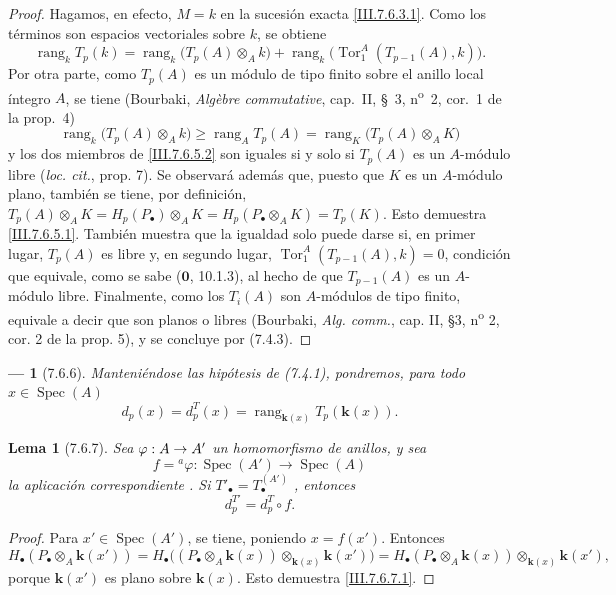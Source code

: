 \documentclass[10pt,oneside,openany]{book}
\theoremstyle{egaenv}\newtheorem*{env}{---}
\theoremstyle{egastatement}
\newtheorem*{lemma}{Lema}
\theoremstyle{egadescription}
\newcommand{\oldpage}[2][]{\marginnote{\normalfont\scriptsize\textbf{#1}\,|\,#2}\ignorespaces}
\renewcommand{\geq}{\geqslant}
\renewcommand{\to}{\mathchoice{\longrightarrow}{\rightarrow}{\rightarrow}{\rightarrow}}
\begin{document}
\begin{proof}
Hagamos, en efecto, $M=k$ en la sucesión exacta \eqref{III.7.6.3.1}. Como los
términos son espacios vectoriales sobre $k$, se obtiene
\[
  \operatorname{rang}_k T_p(k)
  =
  \operatorname{rang}_k\bigl(T_p(A)\otimes_A k\bigr)
  +
  \operatorname{rang}_k\bigl(\operatorname{Tor}_1^A(T_{p-1}(A),k)\bigr).
\]
Por otra parte, como $T_p(A)$ es un módulo de tipo finito sobre el
anillo local íntegro $A$, se tiene (Bourbaki,
\emph{Alg\`ebre commutative}, cap.~II, \S~3,
n\textsuperscript{o}~2, cor.~1 de la prop.~4)
\[
  \operatorname{rang}_k\bigl(T_p(A)\otimes_A k\bigr)
  \geq
  \operatorname{rang}_A T_p(A)
  =
  \operatorname{rang}_K\bigl(T_p(A)\otimes_A K\bigr)
  \tag{7.6.5.2}\label{III.7.6.5.2.fr}
\]
y los dos miembros de \eqref{III.7.6.5.2} son iguales si y solo si
$T_p(A)$ es un $A$-módulo libre (\emph{loc. cit.}, prop. 7). Se observará además que, puesto que $K$ es un $A$-módulo plano, también se tiene, por definición,
$T_p(A)\otimes_A K=H_p(P_\bullet)\otimes_A K=H_p(P_\bullet\otimes_A K)=T_p(K)$.
Esto demuestra \eqref{III.7.6.5.1}. También muestra que la igualdad
solo puede darse si, en primer lugar, $T_p(A)$ es libre y, en segundo
lugar,
$\operatorname{Tor}_1^A(T_{p-1}(A),k)=0$, condición que
equivale, como se sabe ($\mathbf{0}$, 10.1.3), al hecho de que $T_{p-1}(A)$ es un $A$-módulo libre. Finalmente, como los $T_i(A)$ son $A$-módulos de tipo finito,
equivale a decir que son planos o libres (Bourbaki,
\emph{Alg. comm.}, cap. II, \S 3, n\textsuperscript{o} 2, cor. 2 de la prop.
5), y se concluye por (7.4.3).
\end{proof}

\begin{env}[7.6.6]
Manteniéndose las hipótesis de (7.4.1), pondremos, para todo $x\in\operatorname{Spec}(A)$ \[
  d_p(x)=d_p^T(x)=\operatorname{rang}_{\mathbf{k}(x)}T_p(\boldsymbol{k}(x)).
  \tag{7.6.6.1}\label{III.7.6.6.1.fr}
\]
\end{env}

\begin{lemma}[7.6.7]
\label{III.7.6.7}
Sea $\varphi:A\to A'$ un homomorfismo de anillos, y sea
\[
  f={}^a\!\varphi:
  \operatorname{Spec}(A')\longrightarrow\operatorname{Spec}(A)
\]
la aplicación correspondiente \textup{}. Si
$T'_\bullet=T_\bullet^{(A')}$ \textup{}, entonces
\[
  d_p^{T'}=d_p^T\circ f.
  \tag{7.6.7.1}\label{III.7.6.7.1.fr}
\]
\end{lemma}

\oldpage[III]{195}
\begin{proof}
Para $x'\in\operatorname{Spec}(A')$, se tiene, poniendo $x=f(x')$. Entonces
\[
  H_\bullet(P_\bullet\otimes_A\boldsymbol{k}(x'))
  =
  H_\bullet\bigl((P_\bullet\otimes_A\boldsymbol{k}(x))
    \otimes_{\mathbf{k}(x)}\boldsymbol{k}(x')\bigr)
  =
  H_\bullet(P_\bullet\otimes_A\boldsymbol{k}(x))
    \otimes_{\mathbf{k}(x)}\boldsymbol{k}(x'),
\]
porque $\boldsymbol{k}(x')$ es plano sobre $\boldsymbol{k}(x)$. Esto demuestra
\eqref{III.7.6.7.1}.
\end{proof}
\end{document}
